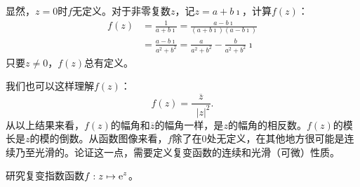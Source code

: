 \documentclass[12pt,UTF8]{ctexbook}
\begin{document}
\begin{so}
    显然，$z = 0$时$f$无定义。对于非零复数$z$，记$z = a + b\imath $，计算$f(z)$：
    \begin{align*}
        f(z) &= \frac{1}{a + b\imath} = \frac{a - b\imath}{(a + b\imath)(a - b\imath)} \\
        &= \frac{a - b\imath}{a^2 + b^2} = \frac{a}{a^2 + b^2} - \frac{b}{a^2 + b^2} \imath
    \end{align*}
    只要$z \neq 0$，$f(z)$总有定义。

    我们也可以这样理解$f(z)$：
    $$ f(z) = \frac{\overline{z}}{\phantom{z}|z|^2}. $$
    从以上结果来看，$f(z)$的幅角和$\overline{z}$的幅角一样，是$z$的幅角的相反数。$f(z)$的模长是$z$的模的倒数。从函数图像来看，$f$除了在$0$处无定义，在其他地方很可能是连续乃至光滑的。论证这一点，需要定义复变函数的连续和光滑（可微）性质。
\end{so}

\begin{et}
    研究复变指数函数$\displaystyle f: z \mapsto \mathrm{e}^z$。
\end{et}
\end{document}
